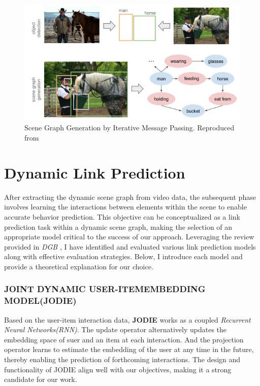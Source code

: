 \begin{figure}
    \centering
    \includegraphics[width=\linewidth]{figures/03_SGG.jpg}
    \caption{Scene Graph Generation by Iterative Message Passing. Reproduced from\cite{tang2020unbiased}}
    \label{fig:SGG}
\end{figure}

\section{Dynamic Link Prediction}


After extracting the dynamic scene graph from video data, the subsequent phase involves learning the interactions between elements within the scene to enable accurate behavior prediction. This objective can be conceptualized as a link prediction task within a dynamic scene graph, making the selection of an appropriate model critical to the success of our approach. Leveraging the review provided in \textit{DGB} \cite{poursafaei2022towards}, I have identified and evaluated various link prediction models along with effective evaluation strategies. Below, I introduce each model and provide a theoretical explanation for our choice.

\subsubsection{ JOINT DYNAMIC USER-ITEMEMBEDDING MODEL(JODIE)}
Based on the user-item interaction data, \textbf{JODIE}\cite{kumar2019predicting} works as a coupled \textit{Recurrent Neural Networks(RNN)}. The update operator alternatively updates the embedding space of suer and an item at each interaction. And the projection operator learns to estimate the embedding of the user at any time in the future, thereby enabling the prediction of forthcoming interactions. The design and functionality of JODIE align well with our objectives, making it a strong candidate for our work.

